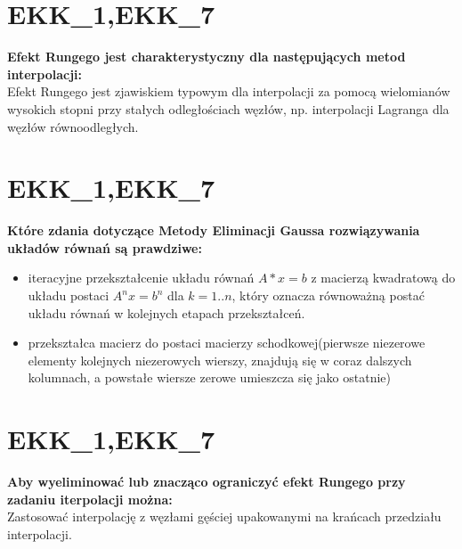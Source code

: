 \section{EKK\_1,EKK\_7}
\textbf{Efekt Rungego jest charakterystyczny dla następujących metod interpolacji: } \\
\vspace{0.4cm}
\noindent Efekt Rungego jest zjawiskiem typowym dla interpolacji za pomocą wielomianów wysokich stopni przy stałych odległościach węzłów, np. interpolacji Lagranga dla węzłów równoodległych. 

\section{EKK\_1,EKK\_7}
\textbf{Które zdania dotyczące Metody Eliminacji Gaussa rozwiązywania  układów równań są prawdziwe:} \\
\vspace{0.4cm}
\noindent \begin{itemize}
 \item iteracyjne przekształcenie układu równań  $A*x=b$ z macierzą kwadratową do układu postaci $A^nx=b^n$ dla $k=1..n$, który oznacza równoważną postać układu równań w kolejnych etapach przekształceń. 
 \item przekształca macierz do postaci macierzy schodkowej(pierwsze niezerowe elementy kolejnych niezerowych wierszy, znajdują się w coraz dalszych kolumnach, a powstałe wiersze zerowe umieszcza się jako ostatnie)
\end{itemize}

\section{EKK\_1,EKK\_7}
\textbf{Aby wyeliminować lub znacząco ograniczyć efekt Rungego przy zadaniu iterpolacji można: } \\
\vspace{0.4cm}
\noindent Zastosować interpolację z węzłami gęściej upakowanymi na krańcach przedziału interpolacji.
